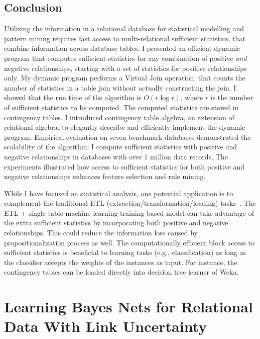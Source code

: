 \documentclass{sfuthesis}
\begin{document}
\section{Conclusion}\label{sec:conclusion}
Utilizing the information in a relational database for statistical modelling and pattern mining requires fast access to multi-relational sufficient statistics, that combine information across database tables. I  presented an efficient dynamic program that computes sufficient statistics for any combination of positive {\em and} negative relationships, starting with a set of statistics for positive relationships only. My dynamic program performs a Virtual Join operation, that counts the number of statistics in a table join without actually constructing the join. I  showed that the run time of the algorithm is $O(r \log r)$, where $r$ is the number of sufficient statistics to be computed. The computed statistics are stored in contingency tables. I  introduced contingency table algebra, an extension of relational algebra, to elegantly describe and efficiently implement the dynamic program. Empirical evaluation on seven benchmark databases demonstrated the scalability of the algorithm; I  compute sufficient statistics with positive and negative relationships in databases with over 1 million data records.  The experiments illustrated how access to sufficient statistics for both positive and negative relationships enhances feature selection and rule mining.%

While I  have focused on statistical analysis, one potential application is to complement the traditional ETL (extraction/transformation/loading) tasks~\cite{Han2011}. The ETL + single table machine learning training based model can take advantage of the extra sufficient statistics by incorporating both positive and negative relationships. This  could reduce the information loss caused by propositionalization process as well.
The computationally efficient block access to sufficient statistics is beneficial to learning tasks (e.g., classification) as long as the classifier accepts the weights of the instances as input. For instance,  the contingency tables can be loaded directly into decision tree learner of Weka. 




\chapter{Learning Bayes Nets for Relational Data With Link Uncertainty }\label{cha:lbn}
\end{document}
